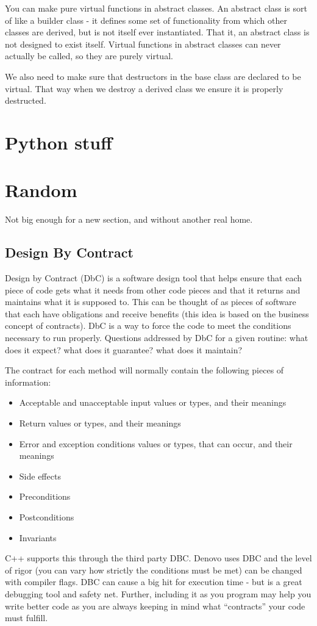 \documentclass[12pt,twoside]{article}
\begin{document}
You can make pure virtual functions in abstract classes. An abstract class is sort of like a builder class - it defines some set of functionality from which other classes are derived, but is not itself ever instantiated. That it, an abstract class is not designed to exist itself. Virtual functions in abstract classes can never actually be called, so they are purely virtual. 

We also need to make sure that destructors in the base class are declared to be virtual. That way when we destroy a derived class we ensure it is properly destructed. 


\section{Python stuff}



\section{Random}
Not big enough for a new section, and without another real home. 
\subsection{Design By Contract}
    Design by Contract (DbC) is a software design tool that helps ensure that each piece of code gets what it needs from other code pieces and that it returns and maintains  what it is supposed to. This can be thought of as pieces of software that each have obligations and receive benefits (this idea is based on the business concept of contracts). DbC is a way to force the code to meet the conditions necessary to run properly. Questions addressed by DbC for a given routine: what does it expect? what does it guarantee? what does it maintain? 
    
    The contract for each method will normally contain the following pieces of information:
\begin{itemize}
   \item Acceptable and unacceptable input values or types, and their meanings
   \item Return values or types, and their meanings
   \item Error and exception conditions values or types, that can occur, and their meanings
   \item Side effects
   \item Preconditions
   \item Postconditions
   \item Invariants
\end{itemize}

C++ supports this through the third party DBC. Denovo uses DBC and the level of rigor (you can vary how strictly the conditions must be met) can be changed with compiler flags. DBC can cause a big hit for execution time - but is a great debugging tool and safety net. Further, including it as you program may help you write better code as you are always keeping in mind what ``contracts'' your code must fulfill. 
\end{document}
